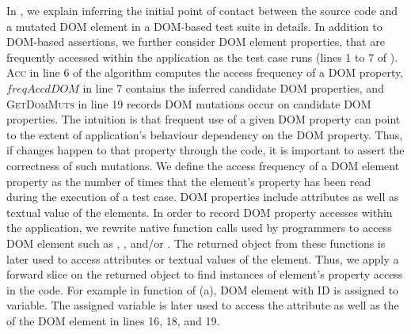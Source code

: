 In , we explain inferring the initial point of contact between the source code and a mutated DOM element in a DOM-based test suite in details.  
In addition to DOM-based assertions, we further consider DOM element properties, that are frequently accessed within the application as the test case runs (lines 1 to 7 of ). 
\textsc{Acc} in line 6 of the algorithm computes the access frequency of a DOM property, $freqAccdDOM$ in line 7 contains the inferred candidate DOM properties, and \textsc{GetDomMuts} in line 19 records DOM mutations occur
on candidate DOM properties.
The intuition is that frequent use of a given DOM property can point to the extent of application's behaviour dependency on the DOM property. Thus, if changes happen to that property through the \javascript code, it is important to assert the correctness of such mutations. We define the access frequency of a DOM element property as the number of times that the element's property has been read during the execution of a test case. DOM properties include attributes as well as textual value of the elements.
In order to record DOM property accesses within the application, we rewrite native function calls used by programmers to access DOM element such as , , and/or . The returned object from these functions is later used to access attributes or textual values of the element. Thus, we apply a forward slice on the returned object to find instances of element's property access in the code.
For example in function  of (a), DOM element with ID  is assigned to  variable. The assigned variable is later used to access the  attribute as well as the 
of the DOM element in lines 16, 18, and 19.

